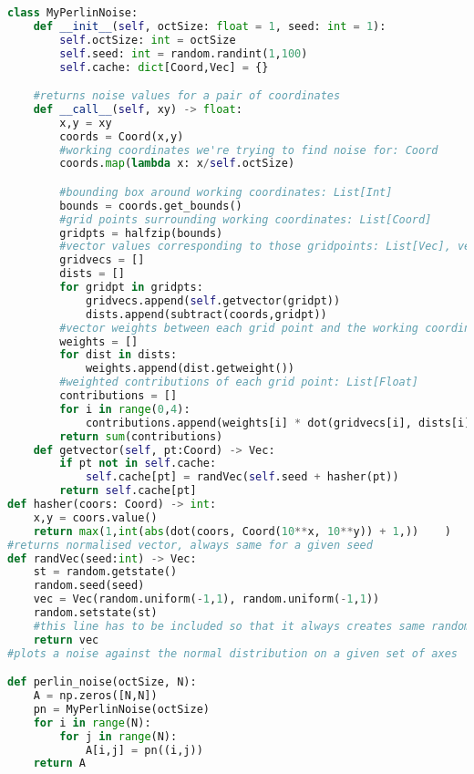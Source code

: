 \documentclass[11pt,a4paper]{article}
\begin{document}
\begin{lstlisting}[language=Python, mathescape=true]
class MyPerlinNoise:
    def __init__(self, octSize: float = 1, seed: int = 1):
        self.octSize: int = octSize
        self.seed: int = random.randint(1,100)
        self.cache: dict[Coord,Vec] = {}

    #returns noise values for a pair of coordinates
    def __call__(self, xy) -> float:
        x,y = xy
        coords = Coord(x,y)
        #working coordinates we're trying to find noise for: Coord
        coords.map(lambda x: x/self.octSize)

        #bounding box around working coordinates: List[Int]
        bounds = coords.get_bounds()
        #grid points surrounding working coordinates: List[Coord]
        gridpts = halfzip(bounds)
        #vector values corresponding to those gridpoints: List[Vec], vector distances between each grid point and the working coordinates: List[Vec]
        gridvecs = []
        dists = []
        for gridpt in gridpts:
            gridvecs.append(self.getvector(gridpt))
            dists.append(subtract(coords,gridpt))
        #vector weights between each grid point and the working coordinates: List[Float], ie how much this should count for, points further away get a smaller weight and v.v.
        weights = []
        for dist in dists:
            weights.append(dist.getweight())
        #weighted contributions of each grid point: List[Float]
        contributions = []
        for i in range(0,4):
            contributions.append(weights[i] * dot(gridvecs[i], dists[i]))
        return sum(contributions)
    def getvector(self, pt:Coord) -> Vec:
        if pt not in self.cache:
            self.cache[pt] = randVec(self.seed + hasher(pt))
        return self.cache[pt]
def hasher(coors: Coord) -> int:
    x,y = coors.value() 
    return max(1,int(abs(dot(coors, Coord(10**x, 10**y)) + 1,))    )
#returns normalised vector, always same for a given seed
def randVec(seed:int) -> Vec:
    st = random.getstate()
    random.seed(seed)
    vec = Vec(random.uniform(-1,1), random.uniform(-1,1))
    random.setstate(st) 
    #this line has to be included so that it always creates same random vector for same input
    return vec
#plots a noise against the normal distribution on a given set of axes

def perlin_noise(octSize, N):
    A = np.zeros([N,N])
    pn = MyPerlinNoise(octSize)
    for i in range(N):
        for j in range(N):
            A[i,j] = pn((i,j))
    return A
\end{lstlisting}
\end{document}
